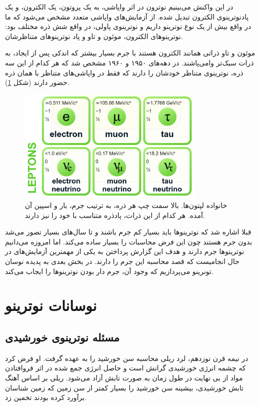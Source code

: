 \documentclass[a4paper,11pt,oneside,openany]{iut-thesis}
\begin{document}
در این واکنش می‌بینیم نوترون در اثر واپاشی، به یک پروتون، یک الکترون، و یک پادنوترینوی الکترون تبدیل شده. از آزمایش‌های واپاشی متعدد مشخص می‌شود که ما در واقع بیش از یک نوع نوترینو داریم و نوترینوی پاولی، در واقع شش ذره مختلف بود: نوترینوهای الکترون، موئون و تاو و پاد نوترینوهای متناظرشان.

موئون و تاو ذراتی همانند الکترون هستند با جرم بسیار بیشتر که اندکی پس از ایجاد، به ذرات سبک‌تر وامی‌پاشند. در دهه‌های ۱۹۵۰ و ۱۹۶۰ مشخص  شد که هر کدام از این سه ذره، نوترینوی متناظر خودشان را دارند که فقط در واپاشی‌های متناظر با همان ذره حضور دارند (شکل 
\ref{leptons}).
\begin{figure}
	\includegraphics[angle=0,width=0.8\textwidth,clip=0]{leptons}
	\caption{
		خانواده لپتون‌ها. بالا سمت چپ هر ذره، به ترتیب جرم، بار و اسپین آن آمده. هر کدام از این ذرات، پادذره متناسب با خود را نیز دارند.
	}
	\label{leptons}
\end{figure}

قبلا اشاره شد که نوترینوها باید بسیار کم جرم باشند و تا سال‌های بسیار تصور می‌شد بدون جرم هستند چون این فرض محاسبات را بسیار ساده می‌کند. اما امروزه می‌دانیم نوترینوها جرم دارند و هدف این گزارش پرداختن به یکی از مهمترین آزمایش‌های در حال انجامیست که قصد محاسبه این جرم را دارند. در بخش بعدی به پدیده نوسان تونرینو می‌پردازیم که وجود آن، جرم دار بودن نوترینوها را ایجاب می‌کند.




\section{
نوسانات نوترینو
}
\subsection{
مسئله نوترینوی خورشیدی
}
در نیمه قرن نوزدهم، لرد ریلی محاسبه سن خورشید را به عهده گرفت. او فرض کرد که چشمه انرژی خورشیدی گرانش است و حاصل انرژی جمع شده در اثر فروافتادن مواد از بی نهایت در طول زمان به صورت تابش آزاد می‌شود. ریلی بر اساس آهنگ تابش خورشیدی، بیشینه سن خورشید را بسیار کمتر از سن زمین که زمین شناسان برآورد کرده بودند تخمین زد.
\end{document}
